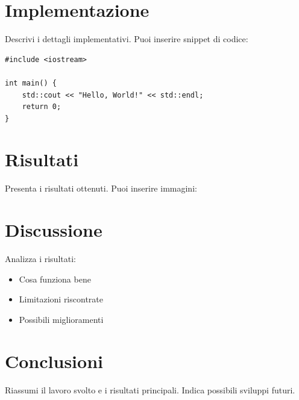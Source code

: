 \documentclass[12pt, a4paper]{article}
\begin{document}
\section{Implementazione}
Descrivi i dettagli implementativi. Puoi inserire snippet di codice:

\begin{lstlisting}[caption={Esempio di codice C++}]
#include <iostream>

int main() {
    std::cout << "Hello, World!" << std::endl;
    return 0;
}
\end{lstlisting}

\section{Risultati}
Presenta i risultati ottenuti. Puoi inserire immagini:


\section{Discussione}
Analizza i risultati:
\begin{itemize}
    \item Cosa funziona bene
    \item Limitazioni riscontrate
    \item Possibili miglioramenti
\end{itemize}

\section{Conclusioni}
Riassumi il lavoro svolto e i risultati principali.
Indica possibili sviluppi futuri.

\newpage
\printbibliography[title={Bibliografia}]
\end{document}
